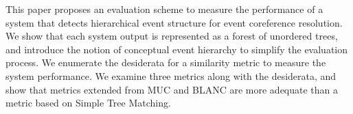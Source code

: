 This paper proposes an evaluation scheme to measure the performance of a system that detects hierarchical event structure for event coreference resolution. We show that each system output is represented as a forest of unordered trees, and introduce the notion of conceptual event hierarchy to simplify the evaluation process. We enumerate the desiderata for a similarity metric to measure the system performance. We examine three metrics along with the desiderata, and show that metrics extended from MUC and BLANC are more adequate than a metric based on Simple Tree Matching.

